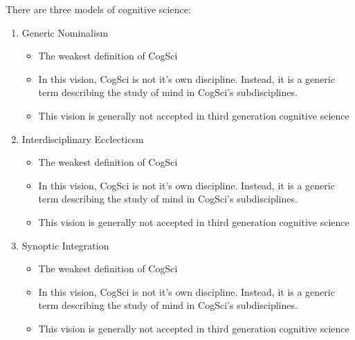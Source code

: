 \documentclass[twoside]{article}
\begin{document}
There are three models of cognitive science:
\begin{enumerate}
  \item Generic Nominalism
    \begin{itemize}
      \item The weakest definition of CogSci
      \item In this vision, CogSci is not it's own discipline. Instead, it is
            a generic term describing the study of mind in CogSci's subdisciplines.
      \item This vision is generally not accepted in third generation cognitive science
    \end{itemize}
  \item Interdisciplinary Ecclecticsm
  \begin{itemize}
    \item The weakest definition of CogSci
    \item In this vision, CogSci is not it's own discipline. Instead, it is
          a generic term describing the study of mind in CogSci's subdisciplines.
    \item This vision is generally not accepted in third generation cognitive science
  \end{itemize}
  \item Synoptic Integration
  \begin{itemize}
    \item The weakest definition of CogSci
    \item In this vision, CogSci is not it's own discipline. Instead, it is
          a generic term describing the study of mind in CogSci's subdisciplines.
    \item This vision is generally not accepted in third generation cognitive science
  \end{itemize}

\end{enumerate}
\end{document}
